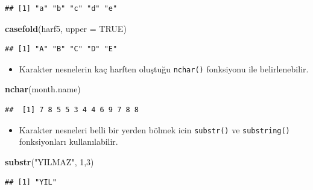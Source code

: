 \documentclass[
  oneside]{book}
\newenvironment{Shaded}{\begin{snugshade}}{\end{snugshade}}
\newcommand{\AttributeTok}[1]{\textcolor[rgb]{0.13,0.29,0.53}{#1}}
\newcommand{\ConstantTok}[1]{\textcolor[rgb]{0.56,0.35,0.01}{#1}}
\newcommand{\DecValTok}[1]{\textcolor[rgb]{0.00,0.00,0.81}{#1}}
\newcommand{\FunctionTok}[1]{\textcolor[rgb]{0.13,0.29,0.53}{\textbf{#1}}}
\newcommand{\NormalTok}[1]{#1}
\newcommand{\StringTok}[1]{\textcolor[rgb]{0.31,0.60,0.02}{#1}}
\providecommand{\tightlist}{%
  \setlength{\itemsep}{0pt}\setlength{\parskip}{0pt}}
\begin{document}
\begin{verbatim}
## [1] "a" "b" "c" "d" "e"
\end{verbatim}

\begin{Shaded}
\begin{Highlighting}[]
\FunctionTok{casefold}\NormalTok{(harf5, }\AttributeTok{upper =} \ConstantTok{TRUE}\NormalTok{)}
\end{Highlighting}
\end{Shaded}

\begin{verbatim}
## [1] "A" "B" "C" "D" "E"
\end{verbatim}

\begin{itemize}
\tightlist
\item
  Karakter nesnelerin kaç harften oluştuğu \texttt{nchar()} fonksiyonu ile belirlenebilir.
\end{itemize}

\begin{Shaded}
\begin{Highlighting}[]
\FunctionTok{nchar}\NormalTok{(month.name)}
\end{Highlighting}
\end{Shaded}

\begin{verbatim}
##  [1] 7 8 5 5 3 4 4 6 9 7 8 8
\end{verbatim}

\begin{itemize}
\tightlist
\item
  Karakter nesneleri belli bir yerden bölmek icin \texttt{substr()} ve \texttt{substring()} fonksiyonları kullanılabilir.
\end{itemize}

\begin{Shaded}
\begin{Highlighting}[]
\FunctionTok{substr}\NormalTok{(}\StringTok{"YILMAZ"}\NormalTok{, }\DecValTok{1}\NormalTok{,}\DecValTok{3}\NormalTok{)}
\end{Highlighting}
\end{Shaded}

\begin{verbatim}
## [1] "YIL"
\end{verbatim}
\end{document}
